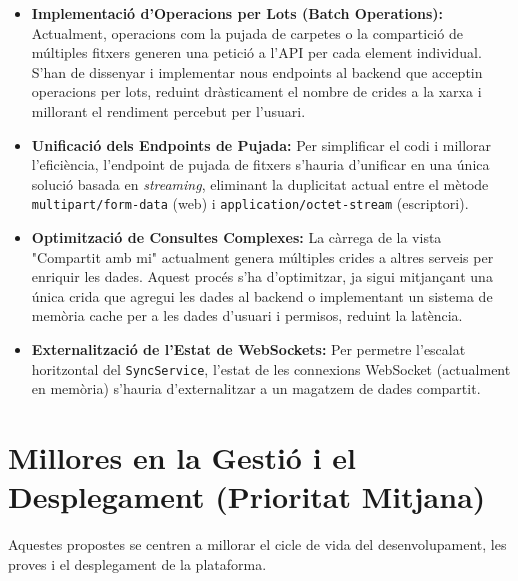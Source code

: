 \begin{itemize}
    \item \textbf{Implementació d'Operacions per Lots (Batch Operations):} Actualment, operacions com la pujada de carpetes o la compartició de múltiples fitxers generen una petició a l'API per cada element individual. S'han de dissenyar i implementar nous endpoints al backend que acceptin operacions per lots, reduint dràsticament el nombre de crides a la xarxa i millorant el rendiment percebut per l'usuari.

    \item \textbf{Unificació dels Endpoints de Pujada:} Per simplificar el codi i millorar l'eficiència, l'endpoint de pujada de fitxers s'hauria d'unificar en una única solució basada en \textit{streaming}, eliminant la duplicitat actual entre el mètode \texttt{multipart/form-data} (web) i \texttt{application/octet-stream} (escriptori).

    \item \textbf{Optimització de Consultes Complexes:} La càrrega de la vista "Compartit amb mi" actualment genera múltiples crides a altres serveis per enriquir les dades. Aquest procés s'ha d'optimitzar, ja sigui mitjançant una única crida que agregui les dades al backend o implementant un sistema de memòria cache per a les dades d'usuari i permisos, reduint la latència.

    \item \textbf{Externalització de l'Estat de WebSockets:} Per permetre l'escalat horitzontal del \texttt{SyncService}, l'estat de les connexions WebSocket (actualment en memòria) s'hauria d'externalitzar a un magatzem de dades compartit.
\end{itemize}

\section{Millores en la Gestió i el Desplegament (Prioritat Mitjana)}

Aquestes propostes se centren a millorar el cicle de vida del desenvolupament, les proves i el desplegament de la plataforma.

